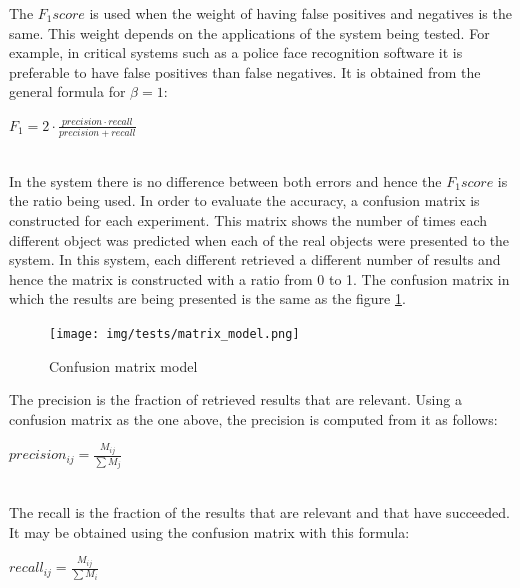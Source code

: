 
		The $F_1 score$ is used when the weight of having false positives and negatives is the same. 
		This weight depends on the applications of the system being tested. 
		For example, in critical systems such as a police face recognition software it is preferable to have false positives than false negatives. 
		It is obtained from the general formula for $\beta=1$: 	
		\\
		\begin{center}
		$F_1=2\cdot\frac{precision \cdot recall}{precision + recall}$
		\end{center}

		\\

		In the system there is no difference between both errors and hence the $F_1 score$ is the ratio being used. 
		In order to evaluate the accuracy, a confusion matrix is constructed for each experiment. 
		This matrix shows the number of times each different object was predicted when each of the real objects were presented to the system. 
		In this system, each different retrieved a different number of results and hence the matrix is constructed with a ratio from 0 to 1. 
		The confusion matrix in which the results are being presented is the same as the figure \ref{matrix_model}. 


		\begin{figure}[H]
				\begin{center}
			    \texttt{[image: img/tests/matrix\_model.png]}
				\caption[Confusion matrix model]{Confusion matrix model}
				\label{matrix_model}

				\end{center}
		\end{figure}


		The precision is the fraction of retrieved results that are relevant.  
		Using a confusion matrix as the one above, the precision is computed from it as follows: 
		\\
		\begin{center}
		$precision_{ij}=\frac{M_{ij}}{\sum M_j}$
		\end{center}

		\\

		The recall is the fraction of the results that are relevant and that have succeeded. 
		It may be obtained using the confusion matrix with this formula: 
		\\
		\begin{center}
		$recall_{ij}=\frac{M_{ij}}{\sum M_i}$
		\end{center}
		\\	

